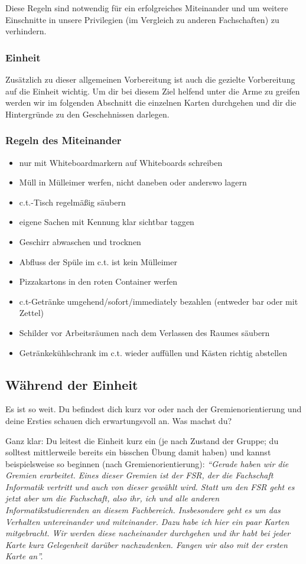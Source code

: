 \documentclass[a4paper,11pt]{scrartcl} %
\newenvironment{myitemize}{\begin{itemize}\itemsep -2pt}{\end{itemize}} %
\begin{document}
Diese Regeln sind notwendig für ein erfolgreiches Miteinander und um weitere Einschnitte in unsere Privilegien (im Vergleich zu anderen Fachschaften) zu verhindern.

\subsubsection*{Einheit}

Zusätzlich zu dieser allgemeinen Vorbereitung ist auch die gezielte Vorbereitung auf die Einheit wichtig. Um dir bei diesem Ziel helfend unter die Arme zu greifen werden wir im folgenden Abschnitt die einzelnen Karten durchgehen und dir die Hintergründe zu den Geschehnissen darlegen.

\subsubsection*{Regeln des Miteinander}
\begin{myitemize}
	\item nur mit Whiteboardmarkern auf Whiteboards schreiben
	\item Müll in Mülleimer werfen, nicht daneben oder anderswo lagern
	\item c.t.-Tisch regelmäßig säubern
	\item eigene Sachen mit Kennung klar sichtbar taggen
	\item Geschirr abwaschen und trocknen
	\item Abfluss der Spüle im c.t. ist kein Mülleimer
	\item Pizzakartons in den roten Container werfen
	\item c.t-Getränke umgehend/sofort/immediately bezahlen (entweder bar oder mit Zettel)
	\item Schilder vor Arbeitsräumen nach dem Verlassen des Raumes säubern
	\item Getränkekühlschrank im c.t. wieder auffüllen und Kästen richtig abstellen
\end{myitemize}


  \subsection{Während der Einheit}
Es ist so weit. Du befindest dich kurz vor oder nach der Gremienorientierung und deine Ersties schauen dich erwartungsvoll an. Was machst du?

Ganz klar: Du leitest die Einheit kurz ein (je nach Zustand der Gruppe; du solltest mittlerweile bereits ein bisschen Übung damit haben) und kannst beispielsweise so beginnen (nach Gremienorientierung): \textit{"`Gerade haben wir die Gremien erarbeitet. Eines dieser Gremien ist der FSR, der die Fachschaft Informatik vertritt und auch von dieser gewählt wird. Statt um den FSR geht es jetzt aber um die Fachschaft, also ihr, ich und alle anderen Informatikstudierenden an diesem Fachbereich.
Insbesondere geht es um das Verhalten untereinander und miteinander. Dazu habe ich hier ein paar Karten mitgebracht. Wir werden diese nacheinander durchgehen und ihr habt bei jeder Karte kurz Gelegenheit darüber nachzudenken. Fangen wir also mit der ersten Karte an"'.} 
\end{document}
